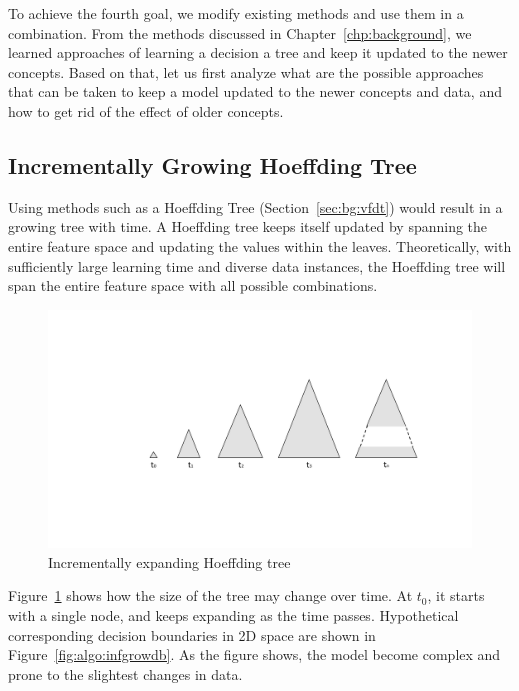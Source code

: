 To achieve the fourth goal, we modify existing methods and use them in a combination. From the methods discussed in Chapter~\ref{chp:background}, we learned approaches of learning a decision a tree and keep it updated to the newer concepts. Based on that, let us first analyze what are the possible approaches that can be taken to keep a model updated to the newer concepts and data, and how to get rid of the effect of older concepts.

\subsection{Incrementally Growing Hoeffding Tree}
Using methods such as a Hoeffding Tree (Section~\ref{sec:bg:vfdt}) would result in a growing tree with time. A Hoeffding tree keeps itself updated by spanning the entire feature space and updating the values within the leaves. Theoretically, with sufficiently large learning time and diverse data instances, the Hoeffding tree will span the entire feature space with all possible combinations.

\begin{figure}[htbp]
    \begin{center}
        \includegraphics[width=14.0cm]{figs/infgrow.pdf}
        \caption{Incrementally expanding Hoeffding tree}
        \label{fig:algo:infgrow}
    \end{center}
\end{figure}

Figure~\ref{fig:algo:infgrow} shows how the size of the tree may change over time. At $t_0$, it starts with a single node, and keeps expanding as the time passes. Hypothetical corresponding decision boundaries in 2D space are shown in Figure~\ref{fig:algo:infgrowdb}. As the figure shows, the model become complex and prone to the slightest changes in data.

